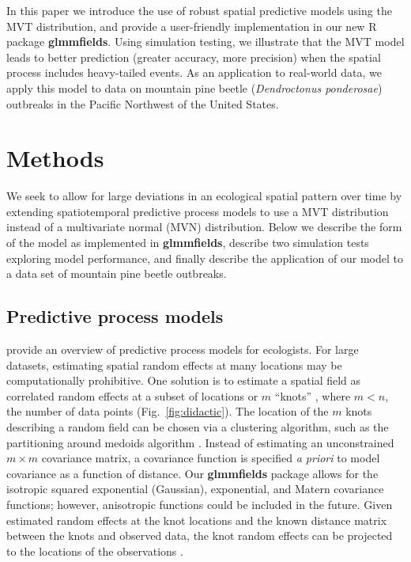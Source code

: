 \documentclass[12pt,english]{article}
\newcommand{\R}[1]{\label{#1}\linelabel{#1}}
\begin{document}
\begin{spacing}{1.8}
In this paper we introduce the use of robust spatial predictive models using the
MVT distribution, and provide a user-friendly implementation in our new R
package \textbf{glmmfields}. Using simulation testing, we illustrate that the
MVT model leads to better prediction (greater accuracy, more precision) when the
spatial process includes heavy-tailed events. As an application to real-world data, we
apply this model to data on mountain pine beetle (\textit{Dendroctonus
  ponderosae}) outbreaks in the Pacific Northwest of the United States.

\section{Methods}

We seek to allow for large deviations in an ecological spatial pattern over time
by extending spatiotemporal predictive process models to use a MVT distribution
instead of a multivariate normal (MVN) distribution. Below we describe the form
of the model as implemented in \textbf{glmmfields}, describe two simulation
tests exploring model performance, and finally describe the application of our
model to a data set of mountain pine beetle outbreaks.

\subsection{Predictive process models}

\citet{latimer2009} provide an overview of predictive process models for
ecologists. For large datasets, estimating spatial random effects at many
locations may be computationally prohibitive. One solution is to estimate a
spatial field as correlated random effects at a subset of locations or $m$
``knots'' \citep[e.g.][]{latimer2009, shelton2014}, where $m < n$, the number of
data points (Fig.~\ref{fig:didactic}).\R{B11} The location of the $m$ knots describing a random field can be
chosen via a clustering algorithm, such as the partitioning around medoids
algorithm \citep{reynolds2006}. Instead of estimating an unconstrained $m \times
m$ covariance matrix, a covariance function is specified \emph{a priori} to
model covariance as a function of distance. Our \textbf{glmmfields} package
allows for the isotropic squared exponential (Gaussian), exponential, and Matern
covariance functions; however, anisotropic functions could be included in the
future. Given estimated random effects at the knot locations and the known
distance matrix between the knots and observed data, the knot random effects can
be projected to the locations of the observations
\citep[][Fig.~\ref{fig:didactic}]{roislien2007, latimer2009, finley2009}.


\end{spacing}
\end{document}
